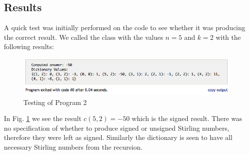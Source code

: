 \subsection{Results} %
\label{sub:results2}
A quick test was initially performed on the code to see whether it was producing the correct result. We called the class with the values $n=5$ and $k=2$ with the following results:
\begin{figure}[H]
    \centering
        \includegraphics[width=6in]{include/prob2test.png}
    \caption{Testing of Program 2}
    \label{fig:include_prob2test}
\end{figure}
In Fig. \ref{fig:include_prob2test} we see the result $c(5,2)=-50$ which is the signed result. There was no specification of whether to produce signed or unsigned Stirling numbers, therefore they were left as signed. Similarly the dictionary is seen to have all necessary Stirling numbers from the recursion.



